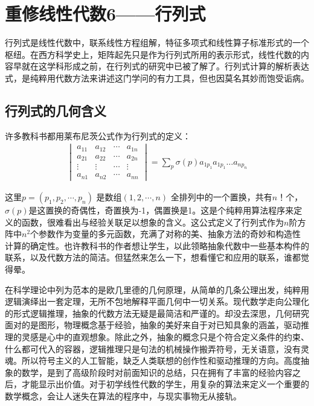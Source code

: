 \chapter{重修线性代数6——行列式}
	行列式是线性代数中，联系线性方程组解，特征多项式和线性算子标准形式的一个枢纽。在西方科学史上，矩阵起先只是作为行列式所用的表示形式，线性代数的内容早就在这学科形成之前，在行列式的研究中已被了解了。行列式计算的解析表达式，是纯粹用代数方法来讲述这门学问的有力工具，但也因莫名其妙而饱受诟病。
	
	\section{行列式的几何含义}
	
	许多教科书都用莱布尼茨公式作为行列式的定义：
	\begin{gather*}
		\begin{vmatrix}a_{11}& a_{12}&\cdots& a_{1n} \\a_{21}& a_{22}&\cdots& a_{2n} \\ \vdots & \vdots&\cdots&\vdots \\a_{n1}& a_{n2} &\cdots& a_{nn}  \end{vmatrix} = \sum_{p}\sigma (p) a_{1p_1}a_{1 p_1}\dots a_{n p_n}
	\end{gather*}

	这里$ p=(p_1,p_2,\cdots, p_n) $ 是数组$  (1, 2,\cdots, n) $ 全排列中的一个置换，共有$ n！ $个，$ \sigma(p) $是这置换的奇偶性，奇置换为-1，偶置换是1。这是个纯粹用算法程序来定义的函数，很难看出与经验关联足以想象的含义。这公式定义了行列式作为$ n $阶方阵中$ n^2 $个参数作为变量的多元函数，充满了对称的美、抽象方法的奇妙和构造性计算的确定性。也许教科书的作者想让学生，以此领略抽象代数中一些基本构件的联系，以及代数方法的简洁。但猛然来怎么一下，想看懂它和应用的联系，谁都觉得晕。
	
	在科学理论中列为范本的是欧几里德的几何原理，从简单的几条公理出发，纯粹用逻辑演绎出一套定理，无所不包地解释平面几何中一切关系。现代数学走向公理化的形式逻辑推理，抽象的代数方法无疑是最简洁和严谨的。却没去深思，几何研究面对的是图形，物理概念基于经验，抽象的美好来自于对已知具象的涵盖，驱动推理的灵感是心中的直观想象。除此之外，抽象的概念只是个符合定义条件的约束、什么都可代入的容器，逻辑推理只是句法的机械操作搬弄符号，无关语意，没有灵魂。所以符号主义的人工智能，缺乏人类联想的创作性和驱动推理的方向。高度抽象的数学，是到了高级阶段时对前面知识的总结，只在拥有了丰富的经验内容之后，才能显示出价值。对于初学线性代数的学生，用复杂的算法来定义一个重要的数学概念，会让人迷失在算法的程序中，与现实事物无从接轨。
	

